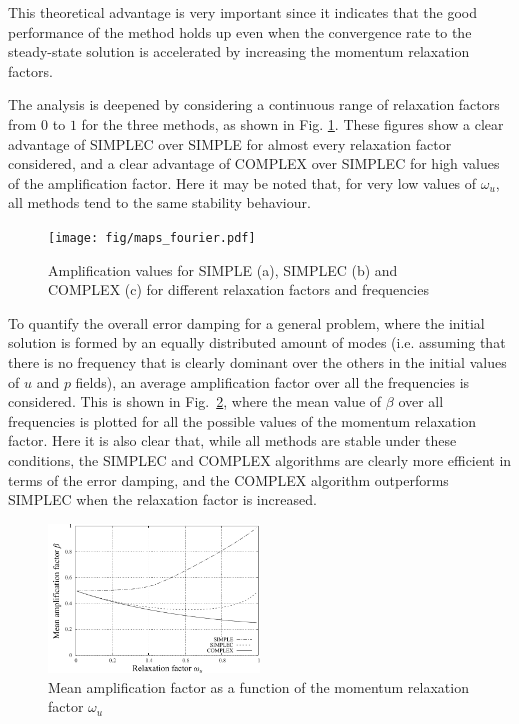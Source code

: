 \documentclass[final,3p,times,11pt,onecolumn]{myElsarticle}
\numberwithin{equation}{section}
\begin{document}
This theoretical advantage is very important since it indicates that the good performance of the method holds up even when the convergence rate to the steady-state solution is accelerated by increasing the momentum relaxation factors. 

The analysis is deepened by considering a continuous range of relaxation factors from $0$ to $1$ for the three methods, as shown in Fig. \ref{fig:1c}. These figures show a clear advantage of SIMPLEC over SIMPLE for almost every relaxation factor considered, and a clear advantage of COMPLEX over SIMPLEC for high values of the amplification factor. Here it may be noted that, for very low values of $\omega_u$, all methods tend to the same stability behaviour.
\begin{figure}[t!]
    \centering
    \texttt{[image: fig/maps\_fourier.pdf]}
    \caption{Amplification values for SIMPLE (a), SIMPLEC (b) and COMPLEX (c) for different relaxation factors and frequencies}
    \label{fig:1c}
\end{figure}    
    
To quantify the overall error damping for a general problem, where the initial solution is formed by an equally distributed amount of modes (i.e. assuming that there is no frequency that is clearly dominant over the others in the initial values of $u$ and $p$ fields), an average amplification factor over all the frequencies is considered. This is shown in Fig.~\ref{fig:1d}, where the mean value of $\beta$ over all frequencies is plotted for all the possible values of the momentum relaxation factor. Here it is also clear that, while all methods are stable under these conditions, the SIMPLEC and COMPLEX algorithms are clearly more efficient in terms of the error damping, and the COMPLEX algorithm outperforms SIMPLEC when the relaxation factor is increased. 

\begin{figure}[t!]
    \centering
    \includegraphics[width=0.5\textwidth]{fig/meanAmp.pdf}
    \caption{Mean amplification factor as a function of the momentum relaxation factor $\omega_u$}
    \label{fig:1d}
\end{figure}  
\end{document}
